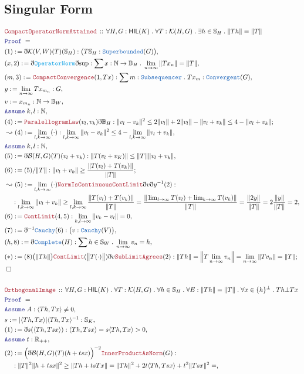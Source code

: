 \documentclass[12pt]{scrartcl}
\newcommand{\TYPE}[1]{\textcolor{NavyBlue}{\mathtt{#1}}}
\newcommand{\FUNC}[1]{\textcolor{Cerulean}{\mathtt{#1}}}
\newcommand{\LOGIC}[1]{\textcolor{Blue}{\mathtt{#1}}}
\newcommand{\THM}[1]{\textcolor{Maroon}{\mathtt{#1}}}
\renewcommand{\.}{\; . \;}
\newcommand{\de}{: \kern 0.1pc =}
\newcommand{\Theorem}[2]{& \THM{#1} \, :: \, #2 \\ & \Proof = \\ }
\newcommand{\NewLine}{\\ & \kern 1pc}
\newcommand{\Page}[1]{\begin{align*} #1 \end{align*} \newpage   }
\newcommand{ \bd }{ \ByDef }
\newcommand{\Reals}{\mathbb{R} }
\newcommand{\Nat}{\mathbb{N} }
\newcommand{\Say}[3]{& #1 \de #2 : #3, \\}
\newcommand{\Conclude}[3]{& #1 \de #2 : #3; \\}
\newcommand{\Derive}[3]{& \leadsto #1 \de #2 : #3, \\}
\newcommand{\A}{\LOGIC{Assume} \;}
\newcommand{\Assume}[2]{& \A #1 : #2, \\}
\newcommand{\QED}{\; \square}
\newcommand{\EndProof}{& \QED \\}
\newcommand{\ByDef}{\eth}
\newcommand{\Proof}{\LOGIC{Proof} \; }
\newcommand{\Ball}{ \mathbb{B} }
\newcommand{\Sphere}{\mathbb{S}}
\newcommand{\SB}{\TYPE{Superbounded}}
\newcommand{\HIL}{\mathsf{HIL}} %
\newcommand{\K}{\mathcal{K}} %
\newcommand{\B}{\mathcal{B}}
\begin{document}
\subsection{ Singular Form}
\Page{   
 \Theorem{CompactOperatorNormAttained}{\forall H,G : \HIL(K) \. \forall T : \K(H,G) \. \exists h \in \Sphere_H \. \| Th \| = \|T\|}
 \Say{ (1) }{\bd \K(V,W)(T)(\Sphere_H)}{ \big(T\Sphere_H : \SB(G) \big)}
 \Say{(x,2)}{\bd \FUNC{OperatorNorm} \bd{\sup}}{ \sum x : \Nat \to \Ball_H \. \lim_{n \to \infty} \|Tx_n\| = \| T \|}
 \Say{(m,3)}{ \THM{CompactConvergence}(1, Tx)}{ \sum m : \TYPE{Subsequencer} \. Tx_m : \TYPE{Convergent}(G)}
 \Say{y}{\lim_{n \to \infty} Tx_{m_n}}{G}
 \Say{v}{x_{m_n}}{\Nat \to \Ball_W}
 \Assume{k,l}{\Nat}
 \Conclude{(4)}{\THM{ParalellogramLaw}(v_l,v_k) \bd \Ball_H}{ \| v_l - v_k \|^2 \le 2\| v_l \| + 2\| v_l\| - \| v_l + v_k \| \le 4 - \| v_l + v_k\| }
 \Derive{(4)}{\lim_{l,k \to \infty}(\cdot)}{ \lim_{l,k \to \infty} \|v_l - v_k \|^2 \le 4 - \lim_{l,k \to \infty} \| v_l + v_k\|}
 \Assume{k,l}{\Nat}
 \Say{(5)}{\bd \B(H,G)(T)(v_l + v_k)}{\| T(v_l + v_K)\| \le \| T \| \| v_l + v_k\|}
 \Conclude{(6)}{(5)/\| T \|}{ \| v_l + v_k\| \ge \frac{\| T(v_l) + T(v_k) \|}{\| T \|} }
 \Derive{(5)}{\lim_{l,k \to \infty} (\cdot) \THM{NormIsContinuous} \THM{ContLimit} \bd v \bd y^{-1} (2) }
 {\NewLine :  \lim_{l,k \to \infty} \| v_l + v_k \| \ge \lim_{l,k \to \infty} \frac{\|T(v_l) + T(v_k)\|}{\|T\|}
  =  \frac{ \| \lim_{l \to \infty} T(v_l) + \lim_{k \to \infty} T(v_k) \|}{\|T\|} = 
   \frac{\| 2 y \| }{\|T\|} = 2 \frac{\|y\|}{\|T\|} = 2  }
 \Say{(6)}{\THM{ContLimit}(4,5)}{\lim_{k,l \to \infty} \| v_k - v_l \| = 0}
 \Say{(7)}{\bd^{-1} \TYPE{Cauchy}(6)}{\big( v : \TYPE{Cauchy}(V) \big)}
 \Say{(h,8)}{\bd \TYPE{Complete}(H)}{\sum h \in \Sphere_W \. \lim_{n \to \infty} v_n = h}
 \Conclude{(*)}{ (8)\big(\|Th\|\big)\THM{ContLimit}(\big\|T(\cdot)\big\|)\bd v \THM{SubLimitAgrees}(2) }
 {\| Th \| = \left \| T \lim_{n \to \infty} v_n \right \| = \lim_{n \to \infty} \| T v_n \| = \| T \|}
 \EndProof
 \\
 \Theorem{OrthogonalImage}{\forall H,G : \HIL(K) \. \forall T : \K(H,G) \. \forall h \in \Sphere_H \. \forall E : \|Th\| = \|T\| \.
   \forall x \in \{ h \}^\bot \.  Th \bot Tx 
 }
 \Assume{A}{ \langle Th,Tx \rangle \neq 0 }
 \Say{s}{ |\langle Th, Tx \rangle|\langle Th,Tx \rangle^{-1}}{ \Sphere_K}
 \Say{(1)}{\bd s (\langle Th, Tsx \rangle)}{\langle Th, Tsx \rangle = s \langle Th, Tx \rangle > 0}
 \Assume{t}{\Reals_{++}}
 \Say{(2)}{ \Big(\bd \B(H,G)(T)(h + tsx) \Big)^{-2} \THM{InnerProductAsNorm}(G) }
 {          \NewLine :
           \| T \|^2\|h +  tsx\|^2 \ge \| Th + tsTx \| = \| Th \|^2 + 2t \langle Th, Tsx \rangle + t^2 \| Tsx \|^2 = 
}}
\end{document}
